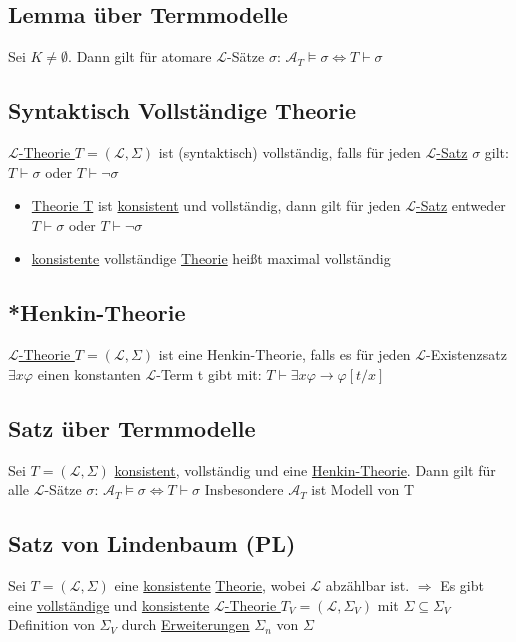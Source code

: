 \documentclass[12pt,a4paper]{article} %
\begin{document}
	\subsection{Lemma über Termmodelle}
	Sei  $K \ne \emptyset$. Dann gilt für atomare $\mathcal{L}$-Sätze $\sigma$: $\mathcal{A}_T \hyperref[Erfullbar]{\vDash} \sigma \Leftrightarrow T \hyperref[Beweisbar]{\vdash} \sigma$
	
	\subsection{Syntaktisch Vollständige Theorie}
	\hyperref[Theorie]{$\mathcal{L}$-Theorie $T = (\mathcal{L}, \Sigma)$} ist (syntaktisch) vollständig, falls für jeden \hyperref[LSatz]{$\mathcal{L}$-Satz} $\sigma$ gilt: $T \hyperref[Beweisbar]{\vdash} \sigma$ oder $T \hyperref[Beweisbar]{\vdash} \neg \sigma$
	\begin{itemize}
		\item \hyperref[Theorie]{Theorie T} ist \hyperref[PLKonsistent]{konsistent} und vollständig, dann gilt für jeden \hyperref[LSatz]{$\mathcal{L}$-Satz} entweder $T \hyperref[Beweisbar]{\vdash} \sigma$ oder $T \hyperref[Beweisbar]{\vdash} \neg \sigma$ 
		\item \hyperref[PLKonsistent]{konsistente} vollständige \hyperref[Theorie]{Theorie} heißt maximal vollständig 
	\end{itemize}

	\subsection{*Henkin-Theorie}
	\label{Henkin}
	\hyperref[Theorie]{$\mathcal{L}$-Theorie $T = (\mathcal{L}, \Sigma)$} ist eine Henkin-Theorie, falls es für jeden $\mathcal{L}$-Existenzsatz $\exists x \varphi$ einen konstanten $\mathcal{L}$-Term t gibt mit: $T \hyperref[Beweisbar]{\vdash} \exists x \varphi \rightarrow \varphi[t/x]$
	
	\subsection{Satz über Termmodelle}
	Sei $T = (\mathcal{L}, \Sigma)$ \hyperref[PLKonsistent]{konsistent}, vollständig und eine \hyperref[Henkin]{Henkin-Theorie}. Dann gilt für alle $\mathcal{L}$-Sätze $\sigma$: $\mathcal{A}_T \hyperref[Erfullbar]{\vDash} \sigma \Leftrightarrow T \hyperref[Beweisbar]{\vdash} \sigma$ Insbesondere $\mathcal{A}_T$ ist Modell von T
	
	\subsection{Satz von Lindenbaum (PL)}
	Sei $T = (\mathcal{L}, \Sigma)$ eine \hyperref[PLKonsistent]{konsistente} \hyperref[Theorie]{Theorie}, wobei $\mathcal{L}$ abzählbar ist. \newline 
	$\Rightarrow$ Es gibt eine \hyperref[TheorieVollstandig]{vollständige} und \hyperref[PLKonsistent]{konsistente} \hyperref[Theorie]{$\mathcal{L}$-Theorie $T_V = (\mathcal{L}, \Sigma_V)$} mit $\Sigma \subseteq \Sigma_V$ \newline
	Definition von $\Sigma_V$ durch \hyperref[Erweiterung]{Erweiterungen} $\Sigma_n$ von $\Sigma$
	
\end{document}
